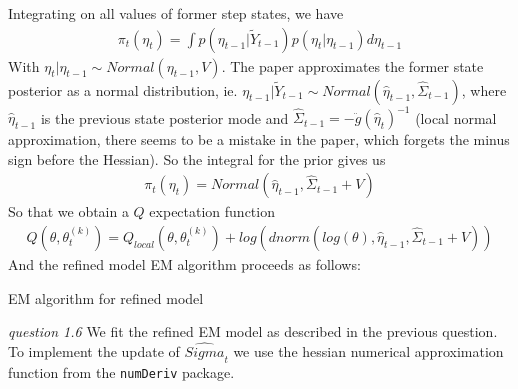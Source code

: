 \documentclass[twoside]{article}
\begin{document}
Integrating on all values of former step states, we have
\begin{align*}
\pi_t(\eta_t) = \int p(\eta_{t - 1} | \tilde{Y}_{t - 1}) p(\eta_t | \eta_{t - 1}) d\eta_{t -1 }
\end{align*}
With $\eta_t | \eta_{t - 1} \sim Normal(\eta_{t - 1}, V)$. The paper approximates the former state posterior as a normal distribution, ie. $\eta_{t - 1} | \tilde{Y}_{t - 1} \sim Normal(\hat{\eta}_{t - 1}, \hat{\Sigma}_{t -1 })$, where $\hat{\eta}_{t - 1}$ is the previous state posterior mode and $\hat{\Sigma}_{t -1 } = - \ddot{g}(\hat{\eta}_t)^{-1}$ (local normal approximation, there seems to be a mistake in the paper, which forgets the minus sign before the Hessian). So the integral for the prior gives us
\begin{align*}
\pi_t(\eta_t) = Normal(\hat{\eta}_{t - 1}, \hat{\Sigma}_{t - 1} + V)
\end{align*}
So that we obtain a $Q$ expectation function
\begin{eqnarray}
Q(\theta, \theta_t^{(k)}) = Q_{local}(\theta, \theta_t^{(k)}) + log\left(dnorm\left(log(\theta), \hat{\eta}_{t - 1}, \hat{\Sigma}_{t - 1} + V\right)\right) 
\end{eqnarray}
And the refined model EM algorithm proceeds as follows:\\

\vspace{.2 in}
\begin{algorithm}[H]
 \caption{EM algorithm for refined model}
\end{algorithm}
\vspace{.2 in}
\textit{question 1.6} We fit the refined EM model as described in the previous question. To implement the update of $\hat{Sigma}_t$ we use the hessian numerical approximation function from the \texttt{numDeriv} package.

\vspace{.2 in}

\end{document}
